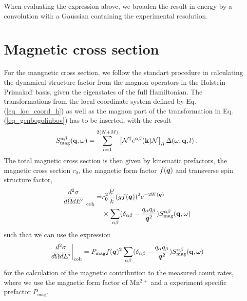 \documentclass[aps,prl,twocolumn,superscriptaddress,amsmath,amssymb,floats,aps,10pt]{revtex4-1}
\begin{document}
When evaluating the expression above, we broaden the result in energy by a convolution with a Gaussian containing the experimental resolution.
\section{Magnetic cross section}
For the mangnetic cross section, we follow the standart procedure in calculating the dynamical structure factor from the magnon
operators in the Holstein-Primakoff basis\cite{Lovesey_book}, given the eigenstates of the full Hamiltonian.
The transformations from the local coordinate system defined by Eq. (\ref{eq_loc_coord_h}) as well as the magnon part of the
transformation in Eq. (\ref{eq_genbogoliubov}) has to be inserted, with the result\cite{Toth15}
\begin{equation}
 { S}^{\alpha\beta}_{\text{mag}}({\bf q},\omega)=\sum_{l=1}^{2(N+M)}\left[\mathcal N^\dagger e^{\alpha\beta}({\bf k}) \mathcal N\right]_{ll} \Delta(\omega,{\bf q},l)\, .
\end{equation}
The total magnetic cross section is then given by kinematic prefactors, the magnetic cross section $r_0$, the magnetic form factor $f(\bm q)$ and transverse spin structure factor,
\begin{align}
  \left.\frac{d^2 \sigma}{d \Omega dE'}\right|_{\text{coh}}=&r_0^2 \frac{k'}{k} (gf(\bm q))^2e^{-2W(\bm q)}\notag\\
  &\times \sum_{\alpha\beta}(\delta_{\alpha\beta}-\frac{q_\alpha q_\beta}{\bm q^2}){ S}^{\alpha\beta}_{\text{mag}}({\bf q},\omega)
\end{align}
such that we can use the expression
\begin{align}
  \left.\frac{d^2 \sigma}{d \Omega dE'}\right|_{\text{coh}}=P_{\text{mag}}f(\bm q)^2\sum_{\alpha\beta}(\delta_{\alpha\beta}-\frac{q_\alpha q_\beta}{\bm q^2}){ S}^{\alpha\beta}_{\text{mag}}({\bf q},\omega)
\end{align}
for the calculation of the magnetic contribution to the measured count rates, where we use the magnetic form factor of Mn$^{2+}$\cite{TabCrys}
and a experiment specific prefactor $P_{\text{mag}}$.
\end{document}
